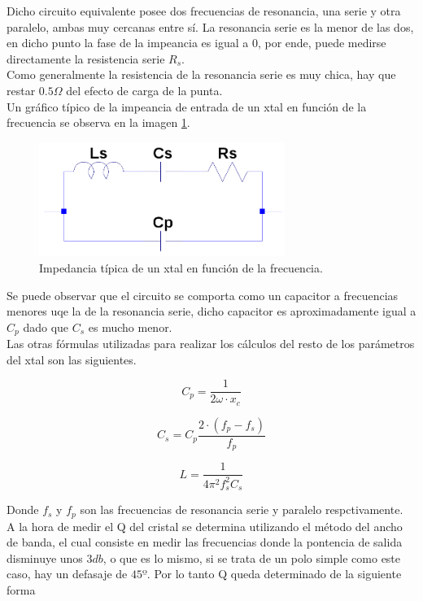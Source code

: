 \documentclass[a4paper,10pt]{article}
\begin{document}
		\indent Dicho circuito equivalente posee dos frecuencias de resonancia,
		una serie y otra paralelo, ambas muy cercanas entre sí. La resonancia 
		serie es la menor de las dos, en dicho punto la fase de la impeancia es
		igual a 0, por ende, puede medirse directamente la resistencia serie 
		$R_s$. \\
		\indent Como generalmente la resistencia de la resonancia serie es muy 
		chica, hay que restar $0.5\Omega$ del efecto de carga de la punta. \\
		\indent Un gráfico típico de la impeancia de entrada de un xtal en 
		función de la frecuencia se observa en la imagen \ref{img005}.
		\begin{figure}[!htb]
			\centering
			\includegraphics[width=8cm]{Imagenes/esqXtal.png}
			\caption{Impedancia típica de un xtal en función de la frecuencia.}
			\label{img005} 
		\end{figure}

		\indent Se puede observar que el circuito se comporta como un capacitor
		a frecuencias menores uqe la de la resonancia serie, dicho capacitor es 
		aproximadamente igual a $C_p$ dado que $C_s$ es mucho menor. \\
		\indent Las otras fórmulas utilizadas para realizar los cálculos del 
		resto de los parámetros del xtal son las siguientes.
	
		\begin{equation} \label{eq001}
			C_p = \frac{1}{2\omega\cdot x_c}		
		\end{equation}
		
		\begin{equation} \label{eq002}
			C_s = C_p \frac{2\cdot(f_p - f_s)}{f_p}
		\end{equation}

		\begin{equation} \label{eq003}
			L = \frac{1}{4\pi^2f_s^2C_s}
		\end{equation}

		\indent Donde $f_s$ y $f_p$ son las frecuencias de resonancia serie y 
		paralelo respctivamente. \\
		\indent A la hora de medir el Q del cristal se determina utilizando el 
		método del ancho de banda, el cual consiste en medir las frecuencias 
		donde la pontencia de salida disminuye unos $3db$, o que es lo mismo, 
		si se trata de un polo simple como este caso, hay un defasaje de $45º$.
		Por lo tanto Q queda determinado de la siguiente forma
		
\end{document}
